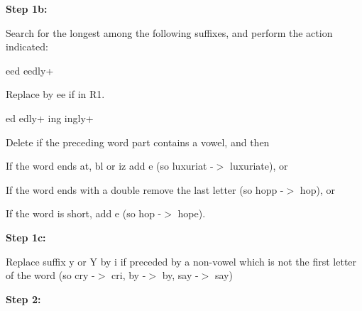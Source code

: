 {\bfseries Step 1b\-:}

Search for the longest among the following suffixes, and perform the action indicated\-:
\begin{DoxyItemize}
\item eed eedly+
\begin{DoxyItemize}
\item Replace by ee if in R1.
\end{DoxyItemize}
\item ed edly+ ing ingly+
\begin{DoxyItemize}
\item Delete if the preceding word part contains a vowel, and then
\item If the word ends at, bl or iz add e (so luxuriat -\/$>$ luxuriate), or
\item If the word ends with a double remove the last letter (so hopp -\/$>$ hop), or
\item If the word is short, add e (so hop -\/$>$ hope).
\end{DoxyItemize}
\end{DoxyItemize}

{\bfseries Step 1c\-:}

Replace suffix y or Y by i if preceded by a non-\/vowel which is not the first letter of the word (so cry -\/$>$ cri, by -\/$>$ by, say -\/$>$ say)

{\bfseries Step 2\-:}

